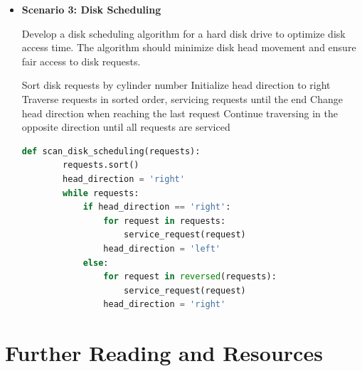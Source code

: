 \documentclass[12pt]{book} %
\begin{document}
\begin{itemize}
    \FloatBarrier
    \begin{lstlisting}[language=Python, caption=Python Implementation of Rate-Monotonic Scheduling Algorithm]
    def rate_monotonic_scheduling(tasks):
        tasks.sort(key=lambda x: x.period)
        for task in tasks:
            execute_task(task)
    \end{lstlisting}
    \FloatBarrier
    
    \item \textbf{Scenario 3: Disk Scheduling}
    
    Develop a disk scheduling algorithm for a hard disk drive to optimize disk access time. The algorithm should minimize disk head movement and ensure fair access to disk requests.
    
    \begin{algorithm}[H]
        \caption{SCAN (Elevator) Disk Scheduling}
        \begin{algorithmic}[1]
            \State Sort disk requests by cylinder number
            \State Initialize head direction to right
            \State Traverse requests in sorted order, servicing requests until the end
            \State Change head direction when reaching the last request
            \State Continue traversing in the opposite direction until all requests are serviced
            \EndProcedure
        \end{algorithmic}
    \end{algorithm}
    
    \FloatBarrier
    \begin{lstlisting}[language=Python, caption=Python Implementation of SCAN Disk Scheduling Algorithm]
    def scan_disk_scheduling(requests):
        requests.sort()
        head_direction = 'right'
        while requests:
            if head_direction == 'right':
                for request in requests:
                    service_request(request)
                head_direction = 'left'
            else:
                for request in reversed(requests):
                    service_request(request)
                head_direction = 'right'
        \end{lstlisting}
    \FloatBarrier
\end{itemize}

\section{Further Reading and Resources}
\end{document}
